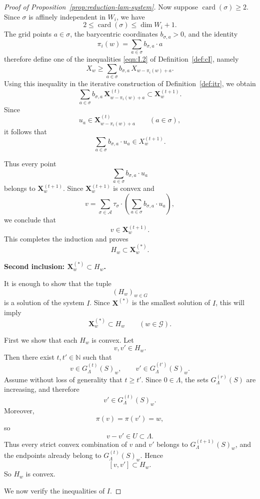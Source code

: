 \documentclass[10pt]{amsart}
\theoremstyle{plain}
\theoremstyle{definition}
\providecommand{\cG}[0]{\ensuremath{\mathcal G}\xspace}
\providecommand{\bX}[0]{\ensuremath{\mathbf X}\xspace}
\let\leq\leqslant
\let\geq\geqslant
\begin{document}
\begin{proof}[Proof of Proposition~\ref{prop:reduction-lam-system}]
Now suppose \(\operatorname{card}(\sigma)\geq 2\).  Since \(\sigma\) is
affinely independent in \(W_i\), we have
\[
        2\leq \operatorname{card}(\sigma)\leq \dim W_i+1.
\]
The grid points \(a\in\sigma\), the barycentric coordinates
\(b_{\sigma,a}>0\), and the identity
\[
        \pi_i(w)=\sum_{a\in\sigma}b_{\sigma,a} \cdot a
\]
therefore define one of the inequalities \eqref{eqn:I.2} of Definition~\ref{def:cI}, namely
\[
        X_w
        \geq
        \sum_{a\in\sigma}
        b_{\sigma,a}\,
        X_{w-\pi_i(w)+a}.
\]
Using this inequality in the iterative construction of Definition~\ref{def:itr},
we obtain
\[
        \sum_{a\in\sigma}
        b_{\sigma,a}\,
        \bX_{w-\pi_i(w)+a}^{(t)}
        \subset
        \bX_w^{(t+1)}.
\]
Since
\[
        u_a\in \bX_{w-\pi_i(w)+a}^{(t)}
        \qquad(a\in\sigma),
\]
it follows that
\[
        \sum_{a\in\sigma}b_{\sigma,a} \cdot u_a\in X_w^{(t+1)}.
\]

Thus every point
\[
        \sum_{a\in\sigma}b_{\sigma,a} \cdot u_a
\]
belongs to \(\bX_w^{(t+1)}\).  Since \(\bX_w^{(t+1)}\) is convex and
\[
        v=
        \sum_{\sigma\in\mathcal A}
        \tau_\sigma \cdot
        \left(\sum_{a\in\sigma}b_{\sigma,a} \cdot u_a \right),
\]
we conclude that
\[
        v\in \bX_w^{(t+1)}.
\]
This completes the induction and proves
\[
        H_w\subset \bX_w^{(*)}.
\]

\medskip
\noindent
\textbf{Second inclusion: \(\bX_w^{(*)}\subset H_w\).}

It is enough to show that the tuple
\[
        (H_w)_{w\in G}
\]
is a solution of the system \(I\). Since \(\bX^{(*)}\) is the smallest
solution of \(I\), this will imply
\[
        \bX_w^{(*)}\subset H_w
        \qquad(w\in \cG).
\]

First we show that each \(H_w\) is convex. Let
\[
        v,v'\in H_w.
\]
Then there exist \(t,t'\in\mathbb N\) such that
\[
        v\in G_\Lambda^{(t)}(S)_w,
        \qquad
        v'\in G_\Lambda^{(t')}(S)_w.
\]
Assume without loss of generality that \(t\geq t'\). Since
\(0\in\Lambda\), the sets \(G_\Lambda^{(r)}(S)\) are increasing, and
therefore
\[
        v'\in G_\Lambda^{(t)}(S)_w.
\]
Moreover,
\[
        \pi(v)=\pi(v')=w,
\]
so
\[
        v-v'\in U\subset\Lambda.
\]
Thus every strict convex combination of \(v\) and \(v'\) belongs to
\(G_\Lambda^{(t+1)}(S)_w\), and the endpoints already belong to
\(G_\Lambda^{(t)}(S)_w\).  Hence
\[
        [v,v']\subset H_w.
\]
So \(H_w\) is convex.

We now verify the inequalities of \(I\).


\end{proof}
\end{document}

